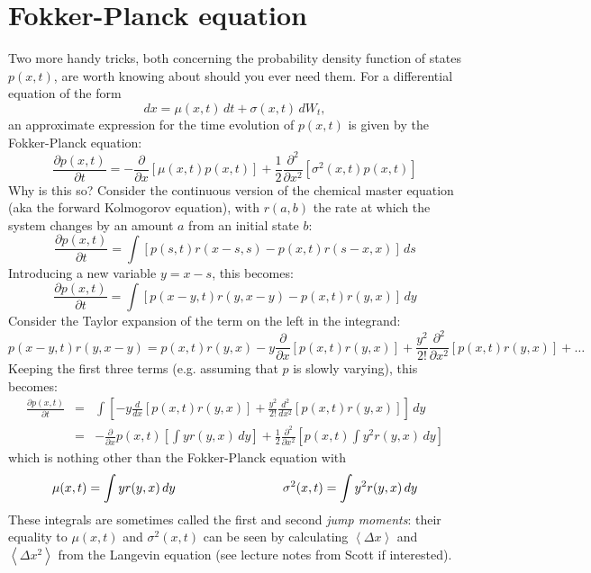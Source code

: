 \documentclass{article}
\begin{document}
\section*{Fokker-Planck equation}
Two more handy tricks, both concerning the probability density function of states $p(x,t)$, are worth knowing about should you ever need them. For a differential equation of the form
\[ dx = \mu(x,t) \, dt + \sigma(x,t) \, dW_t, \]
an approximate expression for the time evolution of $p(x,t)$ is given by the Fokker-Planck equation:
\[ \frac{\partial p(x,t)}{\partial t} = - \frac{\partial }{\partial x} \left[ \mu(x,t) p(x,t) \right] +  \frac{1}{2} \frac{\partial^2 }{\partial x^2} \left[ \sigma^2(x,t) p(x,t) \right]  \]
Why is this so? Consider the continuous version of the chemical master equation (aka the forward Kolmogorov equation), with $r(a,b)$ the rate at which the system changes by an amount $a$ from an initial state $b$:
\[ \frac{\partial p(x,t)}{\partial t} = \int \left[p(s,t) r(x-s,s) - p(x,t) r(s-x, x) \right] \, ds \]
Introducing a new variable $y = x - s$, this becomes:
\[ \frac{\partial p(x,t)}{\partial t} = \int \left[p(x-y,t) r(y,x-y) - p(x,t) r(y, x) \right] \, dy \]
Consider the Taylor expansion of the term on the left in the integrand:
\[ p(x-y,t) r(y,x-y) = p(x,t) r(y,x) - y \frac{\partial }{\partial x} \left[ p(x,t) r(y,x)  \right] + \frac{y^2}{2!} \frac{\partial^2}{\partial x^2} \left[ p(x,t) r(y,x)  \right] + \ldots \]
Keeping the first three terms (e.g. assuming that $p$ is slowly varying), this becomes:
\begin{eqnarray*}
\frac{\partial p(x,t)}{\partial t} & = & \int \left[ - y \frac{d}{dx} \left[ p(x,t) r(y,x)  \right] + \frac{y^2}{2!} \frac{d^2}{dx^2} \left[ p(x,t) r(y,x)  \right] \right] \, dy\\
& = & -  \frac{\partial}{\partial x} p(x,t)  \left[ \int y r(y,x) \, dy  \right] + \frac{1}{2} \frac{\partial^2}{\partial x^2} \left[ p(x,t) \int y^2 r(y,x) \, dy \right]
\end{eqnarray*}
which is nothing other than the Fokker-Planck equation with
\begin{eqnarray*}
\mu(x,t) =  \int y r(y,x) \, dy \hspace{3 cm} \sigma^2(x,t) =  \int y^2 r(y,x) \, dy
\end{eqnarray*}
These integrals are sometimes called the first and second \textit{jump moments}: their equality to $\mu(x,t)$ and $\sigma^2(x,t)$ can be seen by calculating $\left< \Delta x\right>$ and $\left< \Delta x^2\right>$ from the Langevin equation (see lecture notes from Scott if interested).
 
\end{document}
